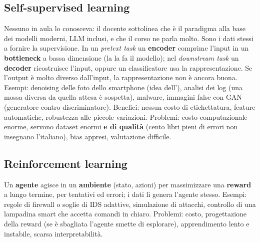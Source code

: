 \subsection{Self-supervised learning}
Nessuno in aula lo conosceva: il docente sottolinea che è il paradigma alla base dei modelli moderni,
LLM inclusi, e che il corso ne parla molto. Sono i dati stessi a fornire la supervisione. In un
\emph{pretext task} un \textbf{encoder} comprime l'input in un \textbf{bottleneck} a bassa dimensione
(la  la fa il modello); nel \emph{downstream task} un \textbf{decoder} ricostruisce
l'input, oppure un classificatore usa la rappresentazione. Se l'output è molto diverso dall'input, la
rappresentazione non è ancora buona. Esempi: denoising delle foto dello smartphone (idea
dell'), analisi dei log (una mossa diversa da quella attesa è sospetta), malware,
immagini false con GAN (generatore contro discriminatore). Benefici: nessun costo di etichettatura,
feature automatiche, robustezza alle piccole variazioni. Problemi: costo computazionale enorme,
servono dataset enormi \textbf{e di qualità} (cento libri pieni di errori non insegnano l'italiano),
bias appresi, valutazione difficile.

\subsection{Reinforcement learning}
Un \textbf{agente} agisce in un \textbf{ambiente} (stato, azioni) per massimizzare una
\textbf{reward} a lungo termine, per tentativi ed errori; i dati li genera l'agente stesso. Esempi:
regole di firewall o soglie di IDS adattive, simulazione di attacchi, controllo di una lampadina smart
che accetta comandi in chiaro. Problemi: costo, progettazione della reward (se è sbagliata l'agente
smette di esplorare), apprendimento lento e instabile, scarsa interpretabilità.

